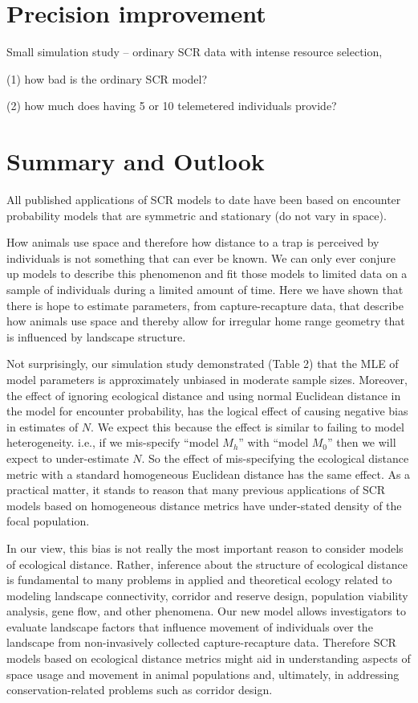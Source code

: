 \section{Precision improvement}

Small simulation study -- ordinary SCR data with intense resource selection,

(1) how bad is the ordinary SCR model?

(2) how much does having 5 or 10 telemetered individuals provide?


\section{Summary and Outlook}


All published applications of SCR models to date have been based on
encounter probability models that are symmetric and stationary (do not
vary in space).


How animals use space and therefore how distance to a trap is
perceived by individuals is not something that can ever be known. We
can only ever conjure up models to describe this phenomenon and fit
those models to limited data on a sample of individuals during a
limited amount of time.  Here we have shown that there is hope to
estimate parameters, from capture-recapture data, that describe how
animals use space and thereby allow for irregular home range geometry
that is influenced by landscape structure.

Not surprisingly, our simulation study demonstrated
(Table 2) that the MLE of model parameters is
approximately unbiased in moderate sample sizes. Moreover, the effect
of ignoring ecological distance and using normal Euclidean distance in
the model for encounter probability, has the logical effect of causing
negative bias in estimates of $N$.  We expect this because the effect
is similar to failing to model heterogeneity. i.e., if we mis-specify
``model $M_h$'' \citep{otis_etal:1978} with ``model $M_0$''
\citep{otis_etal:1978} then we will expect to under-estimate $N$. So
the effect of mis-specifying the ecological distance metric with a
standard homogeneous Euclidean distance has the same effect. As a
practical matter, it stands to reason that many previous applications
of SCR models based on homogeneous distance metrics have under-stated
density of the focal population.

In our view, this bias is not really the most important reason to
consider models of ecological distance. Rather, inference about the
structure of ecological distance is fundamental to many problems in
applied and theoretical ecology related to modeling landscape
connectivity, corridor and reserve design, population viability
analysis, gene flow, and other phenomena.  Our new model allows
investigators to evaluate landscape factors that influence movement of
individuals over the landscape from non-invasively collected
capture-recapture data.  Therefore SCR models based on ecological
distance metrics might aid in understanding
aspects of space usage and movement in animal populations and, ultimately, in addressing conservation-related problems such as corridor design.

